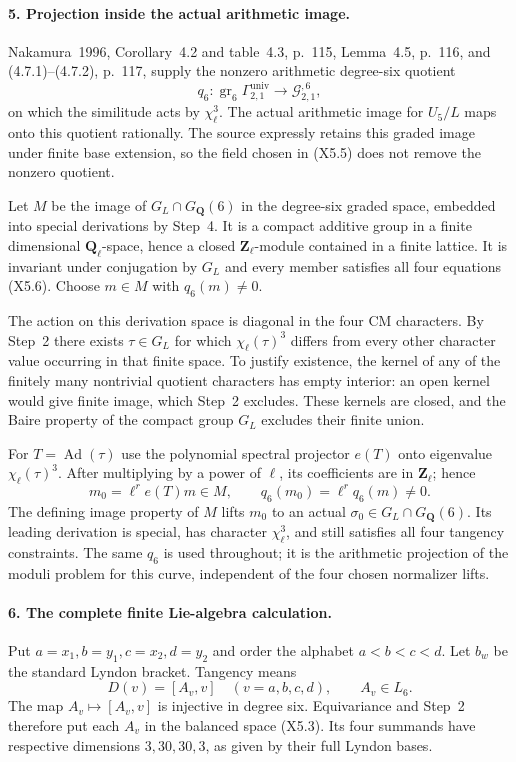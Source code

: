 \paragraph{5. Projection inside the actual arithmetic image.}
Nakamura~1996, Corollary~4.2 and table~4.3, p.~115,
Lemma~4.5, p.~116, and (4.7.1)--(4.7.2), p.~117, supply
the nonzero arithmetic degree-six quotient
\[
 q_6:\operatorname{gr}_6\Gamma^{\mathrm{univ}}_{2,1}
       \longrightarrow \mathcal G_{2,1}^{,6},
\]
on which the similitude acts by $\chi_\ell^3$.
The actual arithmetic image for $U_5/L$ maps onto this
quotient rationally. The source expressly retains this
graded image under finite base extension, so the field
chosen in (X5.5) does not remove the nonzero quotient.

Let $M$ be the image of $G_L\cap G_{\mathbf Q}(6)$ in the
degree-six graded space, embedded into special derivations
by Step~4. It is a compact additive group in a finite
dimensional $\mathbf Q_\ell$-space, hence a closed
$\mathbf Z_\ell$-module contained in a finite lattice.
It is invariant under conjugation by $G_L$ and every
member satisfies all four equations (X5.6).
Choose $m\in M$ with $q_6(m)\ne0$.

The action on this derivation space is diagonal in the
four CM characters. By Step~2 there exists
$\tau\in G_L$ for which $\chi_\ell(\tau)^3$ differs from
every other character value occurring in that finite
space. To justify existence, the kernel of any of the
finitely many nontrivial quotient characters has empty
interior: an open kernel would give finite image, which
Step~2 excludes. These kernels are closed, and the Baire
property of the compact group $G_L$ excludes their finite
union.

For $T=\operatorname{Ad}(\tau)$ use the polynomial
spectral projector $e(T)$ onto eigenvalue
$\chi_\ell(\tau)^3$. After multiplying by a power of
$\ell$, its coefficients are in $\mathbf Z_\ell$; hence
\[
 m_0=\ell^r e(T)m\in M,\qquad
 q_6(m_0)=\ell^r q_6(m)\ne0.
 \tag{X5.7}
\]
The defining image property of $M$ lifts $m_0$ to an actual
$\sigma_0\in G_L\cap G_{\mathbf Q}(6)$. Its leading
derivation is special, has character $\chi_\ell^3$, and
still satisfies all four tangency constraints. The same
$q_6$ is used throughout; it is the arithmetic projection
of the moduli problem for this curve, independent of the
four chosen normalizer lifts.

\paragraph{6. The complete finite Lie-algebra calculation.}
Put $a=x_1,b=y_1,c=x_2,d=y_2$ and order the alphabet
$a<b<c<d$. Let $b_w$ be the standard Lyndon bracket.
Tangency means
\[
 D(v)=[A_v,v]\quad(v=a,b,c,d),\qquad A_v\in L_6.
\]
The map $A_v\mapsto[A_v,v]$ is injective in degree six.
Equivariance and Step~2 therefore put each $A_v$ in the
balanced space (X5.3). Its four summands have respective
dimensions $3,30,30,3$, as given by their full Lyndon bases.

